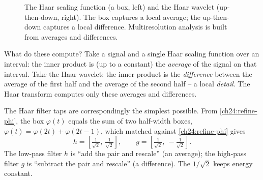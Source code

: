 \begin{figure}[H]
\centering
{}
\caption{The Haar scaling function (a box, left) and the Haar wavelet (up-then-down,
right). The box captures a local average; the up-then-down captures a local
difference. Multiresolution analysis is built from averages and differences.}
\label{ch24:haar-fig}
\end{figure}

What do these compute? Take a signal and a single Haar scaling function over an
interval: the inner product is (up to a constant) the \emph{average} of the signal
on that interval. Take the Haar wavelet: the inner product is the \emph{difference}
between the average of the first half and the average of the second half -- a
local \emph{detail}. The Haar transform computes only these
averages and differences.

The Haar filter taps are correspondingly the simplest possible. From
\eqref{ch24:refine-phi}, the box $\varphi(t)$ equals the sum of two
half-width boxes, $\varphi(t) = \varphi(2t) + \varphi(2t-1)$, which matched
against \eqref{ch24:refine-phi} gives
\begin{equation}
\label{ch24:haar-filters}
h = \left[\tfrac{1}{\sqrt2},\ \tfrac{1}{\sqrt2}\right],
\qquad
g = \left[\tfrac{1}{\sqrt2},\ -\tfrac{1}{\sqrt2}\right].
\end{equation}
The low-pass filter $h$ is ``add the pair and rescale'' (an average); the
high-pass filter $g$ is ``subtract the pair and rescale'' (a difference). The
$1/\sqrt2$ keeps energy constant.

